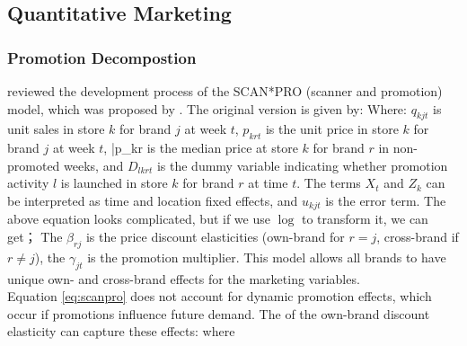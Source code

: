 \documentclass[10pt]{report}
\begin{document}
\subsection{Quantitative Marketing}

\subsubsection{Promotion Decompostion}
\cite{Leeflang2002} reviewed the development process of the SCAN*PRO (scanner and promotion) model, which was proposed by \cite{wittink1988scan}. The original version is given by:
Where: $q_{kjt}$ is unit sales in store $k$ for brand $j$ at week $t$, $p_{krt}$ is the unit price in store $k$ for brand $j$ at week $t$, \bar{p}_{kr} is the median price at store $k$ 
for brand $r$ in non-promoted weeks, and $D_{lkrt}$ is the dummy variable indicating whether promotion activity $l$ is launched in store $k$ for brand $r$ at time $t$. 
The terms $X_t$ and $Z_k$ can be interpreted as time and location fixed effects, and $u_{kjt}$ is the error term. The above equation looks complicated, but if we use $\log$ to transform it, we can get；
The $\beta_{rj}$ is the price discount elasticities (own-brand for $r=j$, cross-brand if $r\ne j$), the $\gamma_{jt}$ is the promotion multiplier. This model allows all brands 
to have unique own- and cross-brand effects for the marketing variables.\\
Equation \ref{eq:scanpro} does not account for dynamic promotion effects, which occur if promotions influence future demand. The  of the own-brand discount elasticity can capture these effects:
where 
\end{document}
